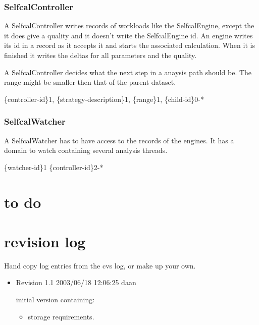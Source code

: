 \documentclass[]{lofar}
\begin{document}
      \subsubsection{SelfcalController}
      \label{id2721696}\hypertarget{id2721696}{}%

        A SelfcalController writes records of workloads like the
        SelfcalEngine, except the it does give a quality and it
        doesn't write the SelfcalEngine id. An engine writes its id in
        a record as it accepts it and starts the associated
        calculation. When it is finished it writes the deltas for all
        parameters and the quality.

        A SelfcalController decides what the next step in a anaysis
        path should be. The range might be smaller then that of the
        parent dataset.

        \{controller-id\}1, \{strategy-description\}1, \{range\}1, \{child-id\}0-*

      \subsubsection{SelfcalWatcher}
      \label{id2721718}\hypertarget{id2721718}{}%

        A SelfcalWatcher has to have access to the records of the
        engines. It has a domain to watch containing several analysis
        threads.

        \{watcher-id\}1 \{controller-id\}2-*

  \section{to do}

\newcommand{\dbappendix}[1]{\section{#1}}%

\appendix

  \dbappendix{revision log}
  \label{id2721729}\hypertarget{id2721729}{}%

    Hand copy log entries from the cvs log, or make up your own.

    \begin{itemize}

      \item 

        Revision 1.1 2003/06/18 12:06:25 daan

        initial version containing:
        \begin{itemize}

	  \item 

            storage requirements.

        \end{itemize}

    \end{itemize}
\end{document}
